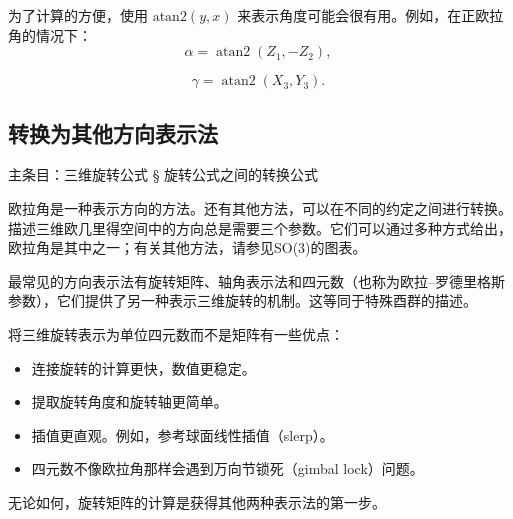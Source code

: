 为了计算的方便，使用 \( \text{atan2}(y, x) \) 来表示角度可能会很有用。例如，在正欧拉角的情况下：
\[
\alpha = \operatorname{atan2}(Z_1, -Z_2),~
\]

\[
\gamma = \operatorname{atan2}(X_3, Y_3).~
\]
\subsection{转换为其他方向表示法} 
主条目：三维旋转公式 § 旋转公式之间的转换公式  

欧拉角是一种表示方向的方法。还有其他方法，可以在不同的约定之间进行转换。描述三维欧几里得空间中的方向总是需要三个参数。它们可以通过多种方式给出，欧拉角是其中之一；有关其他方法，请参见SO(3)的图表。

最常见的方向表示法有旋转矩阵、轴角表示法和四元数（也称为欧拉–罗德里格斯参数），它们提供了另一种表示三维旋转的机制。这等同于特殊酉群的描述。

将三维旋转表示为单位四元数而不是矩阵有一些优点：
\begin{itemize}
\item 连接旋转的计算更快，数值更稳定。
\item 提取旋转角度和旋转轴更简单。
\item 插值更直观。例如，参考球面线性插值（slerp）。
\item 四元数不像欧拉角那样会遇到万向节锁死（gimbal lock）问题。
\end{itemize}
无论如何，旋转矩阵的计算是获得其他两种表示法的第一步。
